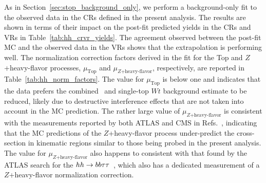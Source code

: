As in Section~\ref{sec:stop_background_only}, we perform a background-only fit to
the observed data in the CRs defined in the present analysis.
The results are shown in terms of their impact on the post-fit predicted yields
in the CRs and VRs in Table~\ref{tab:hh_crvr_yields}.
The agreement observed between the post-fit MC and the observed data in the VRs
shows that the extrapolation is performing well.
The normalization correction factors derived in the fit for the Top and $Z$+heavy-flavor processes,
$\mu_{\text{Top}}$ and $\mu_{Z\text{+heavy-flavor}}$, respectively,
are reported in Table~\ref{tab:hh_norm_factors}.
The value for $\mu_{\text{Top}}$ is below one and indicates that the data prefers the combined \ttbar~and
single-top $Wt$ background estimate to be reduced, likely due to destructive interference effects
that are not taken into account in the MC prediction.
The rather large value of $\mu_{Z\text{+heavy-flavor}}$ is consistent with the measurements
reported by both ATLAS and CMS in Refs.~\cite{Chatrchyan:2013zja,Aad:2014dvb}, indicating that the MC
predictions of the $Z$+heavy-flavor process under-predict the cross-section in kinematic regions similar
to those being probed in the present analysis.
The value for $\mu_{Z\text{+heavy-flavor}}$ also happens to consistent with that found by the ATLAS search for the $hh \rightarrow bb\tau\tau$~\cite{HHBBTAUTAU},
which also has a dedicated measurement of a $Z$+heavy-flavor normalization correction. 

